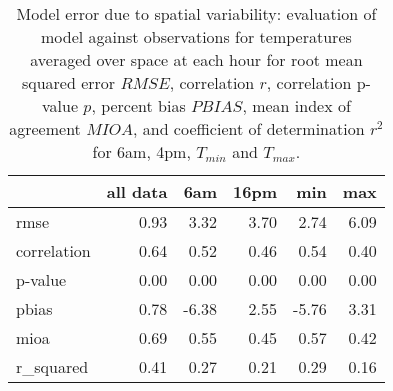 \begin{table}
\centering
\begin{tabular}{lrrrrr}
\toprule
{} &  all data &     6am &   16pm &   min &  max \\
\midrule
rmse        &      0.93 &  3.32 & 3.70 &  2.74 & 6.09 \\
correlation &      0.64 &  0.52 & 0.46 &  0.54 & 0.40 \\
p-value     &      0.00 &  0.00 & 0.00 &  0.00 & 0.00 \\
pbias       &      0.78 & -6.38 & 2.55 & -5.76 & 3.31 \\
mioa        &      0.69 &  0.55 & 0.45 &  0.57 & 0.42 \\
r\_squared   &      0.41 &  0.27 & 0.21 &  0.29 & 0.16 \\
\bottomrule
\end{tabular}


\caption{Model error due to spatial variability: evaluation of model against observations for temperatures averaged over space at each hour for root mean squared error $RMSE$, correlation  $r$, correlation p-value $p$, percent bias $PBIAS$, mean index of agreement $MIOA$, and coefficient of determination $r^2$ for 6am, 4pm, $T_{min}$ and $T_{max}$.  }
\label{tab:space_error}
\end{table}

